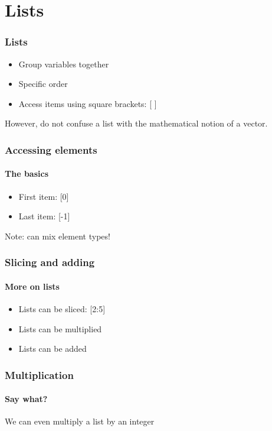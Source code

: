 \section{Lists} %
\label{sec:lists}

\begin{frame}\frametitle{Lists}

    \begin{itemize}
        \item Group variables together
        \item Specific order
        \item Access items using square brackets: [ ]
    \end{itemize}

    However, do not confuse a list with the
    mathematical notion of a vector.

\end{frame}

\begin{frame}\frametitle{Accessing elements}\framesubtitle{The basics}

    \begin{itemize}
        \item First item: [0]
        \item Last item: [-1]
    \end{itemize}


    Note: can mix element types!

\end{frame}

\begin{frame}\frametitle{Slicing and adding}\framesubtitle{More on lists}

    \begin{itemize}
        \item Lists can be sliced: [2:5]
        \item Lists can be multiplied
        \item Lists can be added
    \end{itemize}


\end{frame}

\begin{frame}\frametitle{Multiplication}\framesubtitle{Say what?}

    We can even multiply a list by an integer


\end{frame}

